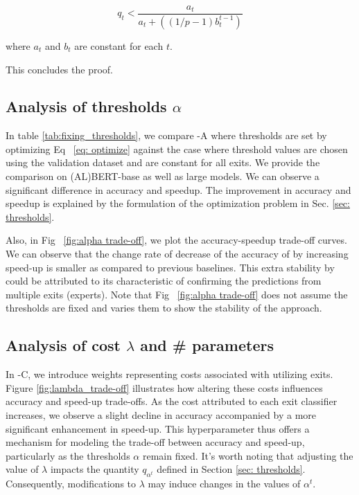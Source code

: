 \begin{equation}
    q_t<\frac{a_t}{a_t+((1/p-1)b_t^{t-1})}
\end{equation}

where $a_t$ and $b_t$ are constant for each $t$.

This concludes the proof.


\subsection{Analysis of thresholds $\alpha$}\label{sec: alpha}
In table \ref{tab:fixing_thresholds}, we compare \algo{}-A where thresholds are set by optimizing Eq~ \ref{eq: optimize} against the case where threshold values are chosen using the validation dataset and are constant for all exits. 
We provide the comparison on (AL)BERT-base as well as large models. We can observe a significant difference in accuracy and speedup. The improvement in accuracy and speedup is explained by the formulation of the optimization problem in Sec. \ref{sec: thresholds}.



Also, in Fig~ \ref{fig:alpha trade-off}, we plot the accuracy-speedup trade-off curves. We can observe that the change rate of decrease of the accuracy of \algo{} by increasing speed-up is smaller as compared to previous baselines. This extra stability by \algo{} could be attributed to its characteristic of confirming the predictions from multiple exits (experts). Note that Fig~ \ref{fig:alpha trade-off} does not assume the thresholds are fixed and varies them to show the stability of the approach.


\subsection{Analysis of cost $\lambda$ and \# parameters}\label{sec: lambda}
In \algo{}-C, we introduce weights representing costs associated with utilizing exits. Figure \ref{fig:lambda_trade-off} illustrates how altering these costs influences accuracy and speed-up trade-offs. As the cost attributed to each exit classifier increases, we observe a slight decline in accuracy accompanied by a more significant enhancement in speed-up. This hyperparameter thus offers a mechanism for modeling the trade-off between accuracy and speed-up, particularly as the thresholds $\alpha$ remain fixed.
It's worth noting that adjusting the value of $\lambda$ impacts the quantity $q_{\alpha^t}$ defined in Section \ref{sec: thresholds}. Consequently, modifications to $\lambda$ may induce changes in the values of $\alpha^t$. 


